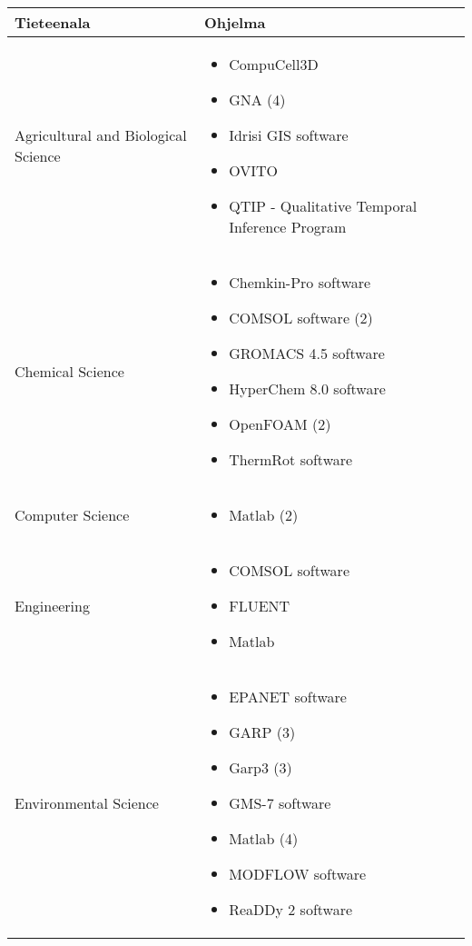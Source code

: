 \documentclass[utf8]{gradu3}
\begin{document}
\begin{longtable}[h]{|p{5cm}|p{8cm}|}
    \hline
    \textbf{Tieteenala}    &    \textbf{Ohjelma}\\
    \hline
    Agricultural and Biological Science & \begin{itemize}
        \item CompuCell3D
        \item GNA (4)
        \item Idrisi GIS software
        \item OVITO
        \item QTIP - Qualitative Temporal Inference Program
    \end{itemize} \\
    \hline
    Chemical Science & \begin{itemize}
        \item Chemkin-Pro software
        \item COMSOL software (2)
        \item GROMACS 4.5 software
        \item HyperChem 8.0 software
        \item OpenFOAM (2)
        \item ThermRot software
    \end{itemize} \\
    \hline
    Computer Science & \begin{itemize}
        \item Matlab (2)
    \end{itemize} \\
    \hline
    Engineering & \begin{itemize}
        \item COMSOL software 
        \item FLUENT
        \item Matlab
    \end{itemize} \\
    \hline
    Environmental Science & \begin{itemize}
        \item EPANET software
        \item GARP (3)
        \item Garp3 (3)
        \item GMS-7 software
        \item Matlab (4)
        \item MODFLOW software
        \item ReaDDy 2 software
    \end{itemize} \\

\end{longtable}
\end{document}
